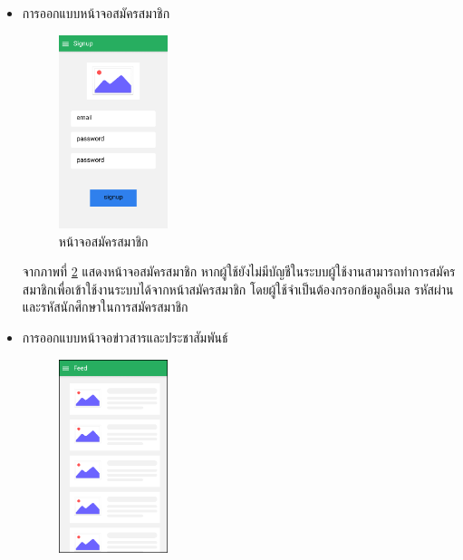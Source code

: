 \begin{enumerate}
\begin{itemize}
\begin{itemize}
\begin{figure}[H]
					\caption{หน้าจอเข้าสู่ระบบ}
					\label{Fig:sign_in}
				\end{figure}
				จากภาพที่ \ref{Fig:sign_in} แสดงหน้าจอสำหรับให้ผู้ใช้ทำการเข้าสู่ระบบเมื่อผู้ใช้ยังไม่ได้ทำการเข้าสู่ระบบ โดยจำเป็นต้องกรอกข้อมูลอีเมลและรหัสผ่านเพื่อใช้ในการเข้าสู่ระบบ ซึ่งการเข้าสู่ระบบจะทำเพียงครั้งเดียวเท่านั้น เมื่อผู้ใช้เปิดการทำงานแอปพลิชันใหม่ในครั้งถัดไประบบจะระบุข้อมูลของผู้ใช้งานอัตโนมัติ
				\item การออกแบบหน้าจอสมัครสมาชิก
				\begin{figure}[H]
					\centering
					\includegraphics[width=0.3\textwidth]{Figures/3/UIMobile/sign_up}
					\caption{หน้าจอสมัครสมาชิก}
					\label{Fig:sign_up1}
				\end{figure}
				จากภาพที่ \ref{Fig:sign_up1} แสดงหน้าจอสมัครสมาชิก หากผู้ใช้ยังไม่มีบัญชีในระบบผู้ใช้งานสามารถทำการสมัครสมาชิกเพื่อเข้าใช้งานระบบได้จากหน้าสมัครสมาชิก โดยผู้ใช้จำเป็นต้องกรอกข้อมูลอีเมล รหัสผ่านและรหัสนักศึกษาในการสมัครสมาชิก
				\item การออกแบบหน้าจอข่าวสารและประชาสัมพันธ์
				\begin{figure}[H]
					\centering
					\includegraphics[width=0.3\textwidth]{Figures/3/UIMobile/home_feed}

\end{figure}
\end{itemize}
\end{itemize}
\end{enumerate}
